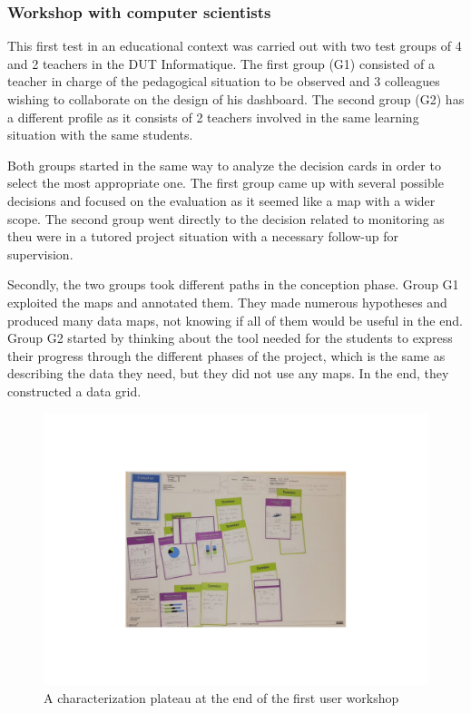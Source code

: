 \documentclass[preprint,12pt]{elsarticle}
\begin{document}
\subsubsection{Workshop with computer scientists}
This first test in an educational context was carried out with two test groups of 4 and 2 teachers in the DUT Informatique. The first group (G1) consisted of a teacher in charge of the pedagogical situation to be observed and 3 colleagues wishing to collaborate on the design of his dashboard. The second group (G2) has a different profile as it consists of 2 teachers involved in the same learning situation with the same students. 

Both groups started in the same way to analyze the decision cards in order to select the most appropriate one. The first group came up with several possible decisions and focused on the evaluation as it seemed like a map with a wider scope. The second group went directly to the decision related to monitoring as theu were in a tutored project situation with a necessary follow-up for supervision. 

Secondly, the two groups took different paths in the conception phase. Group G1 exploited the maps and annotated them. They made numerous hypotheses and produced many data maps, not knowing if all of them would be useful in the end. Group G2 started by thinking about the tool needed for the students to express their progress through the different phases of the project, which is the same as describing the data they need, but they did not use any maps. In the end, they constructed a data grid. 

\begin{figure}[!htp]
    \centering
    \includegraphics[width= \linewidth]{figs/fig2.pdf}
    \caption{A characterization plateau at the end of the first user workshop}
    \label{fig:fig2}
    \end{figure}
\end{document}
